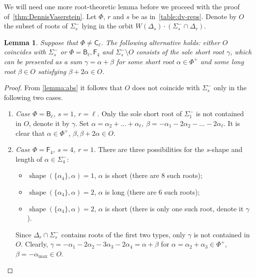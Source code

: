 \documentclass[11pt]{amsart}
\theoremstyle{plain}
\numberwithin{equation}{section}
\newtheorem{lemma}{Lemma}
\numberwithin{lemma}{section}
\theoremstyle{definition}
\theoremstyle{remark}
\DeclareMathOperator{\shape}{shape}
\newcommand{\rB}{\mathsf{B}}
\newcommand{\rC}{\mathsf{C}}
\newcommand{\rF}{\mathsf{F}}
\begin{document}
We will need one more root-theoretic lemma before we proceed with the proof of~\cref{thm:DennisVaserstein}.
Let $\Phi$, $r$ and $s$ be as in~\cref{table:dv-reps}.
Denote by $O$ the subset of roots of $\Sigma_s^-$ lying in the orbit $W(\Delta_s) \cdot (\Sigma^-_s\cap \Delta_r)$.
\begin{lemma} \label{lemma:root-lemma}
Suppose that $\Phi \neq \rC_\ell$. The following alternative holds: either $O$ coincides with $\Sigma_s^-$ or
$\Phi=\rB_\ell, \rF_4$ and $\Sigma_s^- \setminus O$ consists of the sole short root $\gamma$, which can be presented as a sum 
 $\gamma = \alpha + \beta$ for some short root $\alpha \in \Phi^+$ and some long root $\beta \in O$ satisfying $\beta + 2\alpha \in O$. 
\end{lemma}
\begin{proof}
From \cref{lemma:abs} it follows that $O$ does not coincide with $\Sigma^-_s$ only in the following two cases.
 \begin{enumerate} 
 \item \textit{Case $\Phi = \rB_\ell$, $s=1$, $r=\ell$.} 
 Only the sole short root of $\Sigma_1^-$ is not contained in $O$, denote it by $\gamma$. Set $\alpha = \alpha_2 + \ldots + \alpha_\ell,\ \beta = -\alpha_1 - 2\alpha_2 - \ldots -2\alpha_\ell.$
 It is clear that $\alpha \in \Phi^+$, $\beta, \beta + 2\alpha \in O$.
 \item \textit{Case $\Phi = \rF_4$, $s=4$, $r=1$.} There are three possibilities for the $s$-shape and length of $\alpha\in \Sigma_4^-$: 
 \begin{itemize}
  \item $\shape(\{\alpha_4\}, \alpha) = 1$, $\alpha$ is short (there are 8 such roots);
  \item $\shape(\{\alpha_4\}, \alpha) = 2$, $\alpha$ is long (there are 6 such roots);
  \item $\shape(\{\alpha_4\}, \alpha) = 2$, $\alpha$ is short (there is only one such root, denote it $\gamma$).
 \end{itemize}
 Since $\Delta_r \cap \Sigma_s^-$ contains roots of the first two types, only $\gamma$ is not contained in $O$.
 Clearly, $\gamma = -\alpha_1 -2\alpha_2-3\alpha_3-2\alpha_4 = \alpha + \beta$ for $\alpha = \alpha_2 + \alpha_3\in \Phi^+,$ $\beta = -\alpha_{{\max}} \in O$. \qedhere
\end{enumerate}
\end{proof}
\end{document}
